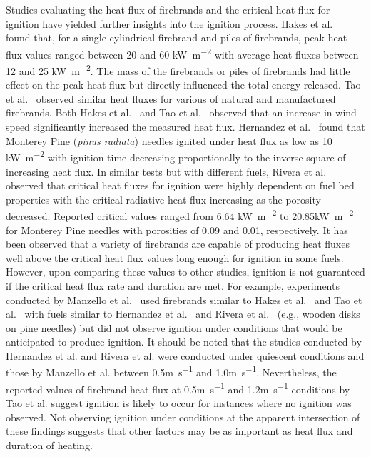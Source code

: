     Studies evaluating the heat flux of firebrands and the critical heat flux for ignition have yielded further insights into the ignition process. Hakes et al.~\cite{Hakes2019a} found that, for a single cylindrical firebrand and piles of firebrands, peak heat flux values ranged between 20 and 60 \si{\kilo\watt\per\square\meter} with average heat fluxes between 12 and 25 \si{\kilo\watt\per\square\meter}. The mass of the firebrands or piles of firebrands had little effect on the peak heat flux but directly influenced the total energy released. Tao et al.~\cite{Tao2020} observed similar heat fluxes for various of natural and manufactured firebrands. Both Hakes et al.~\cite{Hakes2019a} and Tao et al.~\cite{Tao2020} observed that an increase in wind speed significantly increased the measured heat flux. Hernandez et al.~\cite{Hernandez2017} found that Monterey Pine (\textit{pinus radiata}) needles ignited under heat flux as low as 10 \si{\kilo\watt\per\square\meter} with ignition time decreasing proportionally to the inverse square of increasing heat flux. In similar tests but with different fuels, Rivera et al.~\cite{Rivera2020} observed that critical heat fluxes for ignition were highly dependent on fuel bed properties with the critical radiative heat flux increasing as the porosity decreased. Reported critical values ranged from 6.64 \si{\kilo\watt\per\square\meter} to 20.85\si{\kilo\watt\per\square\meter} for Monterey Pine needles with porosities of 0.09 and 0.01, respectively. It has been observed that a variety of firebrands are capable of producing heat fluxes well above the critical heat flux values long enough for ignition in some fuels. However, upon comparing these values to other studies, ignition is not guaranteed if the critical heat flux rate and duration are met. For example, experiments conducted by Manzello et al.~\cite{Manzello2008} used firebrands similar to Hakes et al.~\cite{Hakes2019a} and Tao et al.~\cite{Tao2020} with fuels similar to Hernandez et al.~\cite{Hernandez2017} and Rivera et al.~\cite{Rivera2020} (e.g., wooden disks on pine needles) but did not observe ignition under conditions that would be anticipated to produce ignition. It should be noted that the studies conducted by Hernandez et al. and Rivera et al. were conducted under quiescent conditions and those by Manzello et al. between 0.5\si{\meter\per\second} and 1.0\si{\meter\per\second}. Nevertheless, the reported values of firebrand heat flux at 0.5\si{\meter\per\second} and 1.2\si{\meter\per\second} conditions by Tao et al. suggest ignition is likely to occur for instances where no ignition was observed. Not observing ignition under conditions at the apparent intersection of these findings suggests that other factors may be as important as heat flux and duration of heating. 

